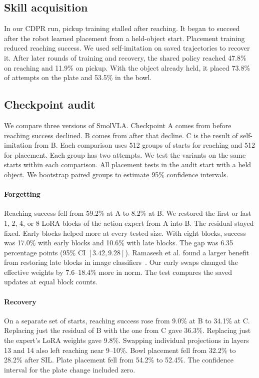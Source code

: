 \subsection{Skill acquisition}\label{sec:skill_retention}
In our CDPR run, pickup training stalled after reaching. It began to succeed after the robot learned placement from a held-object start. Placement training reduced reaching success. We used self-imitation on saved trajectories to recover it. After later rounds of training and recovery, the shared policy reached 47.8\% on reaching and 11.9\% on pickup. With the object already held, it placed 73.8\% of attempts on the plate and 53.5\% in the bowl.

\subsection{Checkpoint audit}\label{sec:checkpoint_audit}
We compare three versions of SmolVLA. Checkpoint A comes from before reaching success declined. B comes from after that decline. C is the result of self-imitation from B. Each comparison uses 512 groups of starts for reaching and 512 for placement. Each group has two attempts. We test the variants on the same starts within each comparison. All placement tests in the audit start with a held object. We bootstrap paired groups to estimate 95\% confidence intervals.

\paragraph{Forgetting}
Reaching success fell from 59.2\% at A to 8.2\% at B. We restored the first or last 1, 2, 4, or 8 LoRA blocks of the action expert from A into B. The residual stayed fixed. Early blocks helped more at every tested size. With eight blocks, success was 17.0\% with early blocks and 10.6\% with late blocks. The gap was 6.35 percentage points (95\% CI $[3.42,9.28]$). Ramasesh et al. found a larger benefit from restoring late blocks in image classifiers~\cite[Fig.~1]{ramasesh2021}. Our early swaps changed the effective weights by 7.6--18.4\% more in norm. The test compares the saved updates at equal block counts.

\paragraph{Recovery}
On a separate set of starts, reaching success rose from 9.0\% at B to 34.1\% at C. Replacing just the residual of B with the one from C gave 36.3\%. Replacing just the expert's LoRA weights gave 9.8\%. Swapping individual projections in layers 13 and 14 also left reaching near 9--10\%. Bowl placement fell from 32.2\% to 28.2\% after SIL. Plate placement fell from 54.2\% to 52.4\%. The confidence interval for the plate change included zero.

